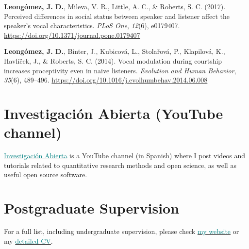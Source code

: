 \documentclass[11pt, a4paper]{awesome-cv}
\begin{document}
\leavevmode\hypertarget{ref-Leongomez2017}{}%
\textbf{Leongómez, J. D.}, Mileva, V. R., Little, A. C., \& Roberts, S.
C. (2017). {Perceived differences in social status between speaker and
listener affect the speaker's vocal characteristics}. \emph{PLoS One},
\emph{12}(6), e0179407.
\url{https://doi.org/10.1371/journal.pone.0179407}

\leavevmode\hypertarget{ref-Leongomez2014}{}%
\textbf{Leongómez, J. D.}, Binter, J., Kubicová, L., Stolařová, P.,
Klapilová, K., Havlíček, J., \& Roberts, S. C. (2014). {Vocal modulation
during courtship increases proceptivity even in naive listeners}.
\emph{Evolution and Human Behavior}, \emph{35}(6), 489--496.
\url{https://doi.org/10.1016/j.evolhumbehav.2014.06.008}

\endgroup

\hypertarget{investigaciuxf3n-abierta-youtube-channel}{%
\section{Investigación Abierta (YouTube
channel)}\label{investigaciuxf3n-abierta-youtube-channel}}

\href{https://www.youtube.com/c/InvestigaciónAbierta}{\textcolor{red}{\faYoutubePlay}
\textcolor{teal}{Investigación Abierta}} is a YouTube channel (in
Spanish) where I post videos and tutorials related to quantitative
research methods and open science, as well as useful open source
software.

\hypertarget{postgraduate-supervision}{%
\section{Postgraduate Supervision}\label{postgraduate-supervision}}

For a full list, including undergraduate supervision, please check
\href{https://jdleongomez.info/en/team/\#students}{\textcolor{teal}{my website}}
or my
\href{https://jdleongomez.info/en/files/jdl_cv_en.pdf}{\textcolor{teal}{detailed CV}}.
\end{document}
